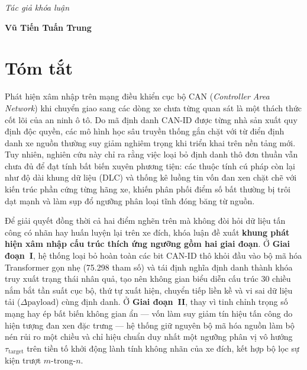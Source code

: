 \documentclass[12pt, a4paper, reqno, oneside]{book}
\newcommand\chap[1]{%
  \clearpage\phantomsection%
  \chapter*{#1}%
  \addcontentsline{toc}{chapter}{#1}%
  \markboth{#1}{}%
}
\begin{document}
\begin{flushright}
{\it Tác giả khóa luận}
\hskip 1.5cm\quad

\vskip 2cm
{\bf Vũ Tiến Tuấn Trung}  \quad\ \quad
\end{flushright}

\newpage

\chap{Tóm tắt}
\vspace{-10pt}

Phát hiện xâm nhập trên mạng điều khiển cục bộ CAN (\textit{Controller Area Network}) khi chuyển giao sang các dòng xe chưa từng quan sát là một thách thức cốt lõi của an ninh ô tô. Do mã định danh CAN-ID được từng nhà sản xuất quy định độc quyền, các mô hình học sâu truyền thống gắn chặt với từ điển định danh xe nguồn thường suy giảm nghiêm trọng khi triển khai trên nền tảng mới. Tuy nhiên, nghiên cứu này chỉ ra rằng việc loại bỏ định danh thô đơn thuần vẫn chưa đủ để đạt tính bất biến xuyên phương tiện: các thuộc tính cú pháp còn lại như độ dài khung dữ liệu (DLC) và thống kê luồng tin vốn đan xen chặt chẽ với kiến trúc phần cứng từng hãng xe, khiến phân phối điểm số bất thường bị trôi dạt mạnh và làm sụp đổ ngưỡng phân loại tĩnh đóng băng từ nguồn.

Để giải quyết đồng thời cả hai điểm nghẽn trên mà không đòi hỏi dữ liệu tấn công có nhãn hay huấn luyện lại trên xe đích, khóa luận đề xuất \textbf{khung phát hiện xâm nhập cấu trúc thích ứng ngưỡng gồm hai giai đoạn}. Ở \textbf{Giai đoạn~I}, hệ thống loại bỏ hoàn toàn các bit CAN-ID thô khỏi đầu vào bộ mã hóa Transformer gọn nhẹ (75.298 tham số) và tái định nghĩa định danh thành khóa truy xuất trạng thái nhân quả, tạo nên không gian biểu diễn cấu trúc 30 chiều nắm bắt tần suất cục bộ, thứ tự xuất hiện, chuyển tiếp liền kề và vi sai dữ liệu tải ($\Delta\text{payload}$) cùng định danh. Ở \textbf{Giai đoạn~II}, thay vì tinh chỉnh trọng số mạng hay ép bất biến không gian ẩn — vốn làm suy giảm tín hiệu tấn công do hiện tượng đan xen đặc trưng — hệ thống giữ nguyên bộ mã hóa nguồn làm bộ nén rủi ro một chiều và chỉ hiệu chuẩn duy nhất một ngưỡng phân vị vô hướng $\tau_{\text{target}}$ trên tiền tố khởi động lành tính không nhãn của xe đích, kết hợp bộ lọc sự kiện trượt $m$-trong-$n$.
\end{document}
